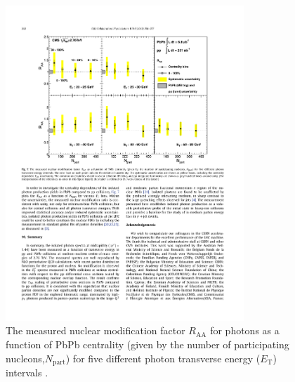 \begin{figure}[htpb]
  \centering
  \includegraphics[width=0.8\textwidth]{Introduction/photon_raa}
  \caption{The measured nuclear modification factor $R_\mathrm{AA}$ for photons as a function of PbPb centrality (given by the number of participating nucleons,$N_\mathrm{part}$) for five different photon transverse energy ($E_\mathrm{T}$) intervals \cite{Chatrchyan2012}.}
  \label{fig:photon_raa}
\end{figure}



